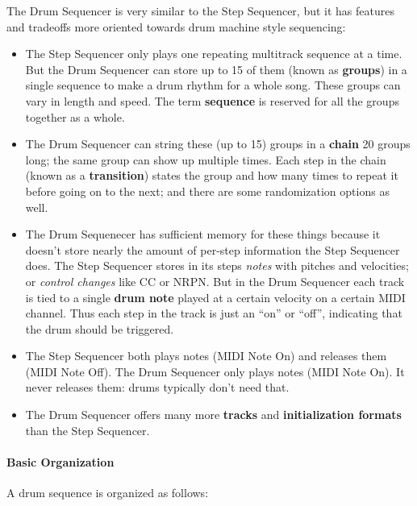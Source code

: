 \documentclass{article}
\begin{document}
The Drum Sequencer is very similar to the Step Sequencer, but it has features and tradeoffs more oriented towards drum machine style sequencing:

\begin{itemize}
\item The Step Sequencer only plays one repeating multitrack sequence at a time.   But the Drum Sequencer can store up to 15 of them (known as {\bf groups}) in a single sequence to make a drum rhythm for a whole song.  These groups can vary in length and speed.  The term {\bf sequence} is reserved for all the groups together as a whole.
\end{itemize}

\begin{itemize}
\item The Drum Sequencer can string these (up to 15) groups in a {\bf chain} 20 groups long; the same group can show up multiple times.  Each step in the chain (known as a {\bf transition}) states the group and how many times to repeat it before going on to the next; and there are some randomization options as well.
\item The Drum Sequenecer has sufficient memory for these things because it doesn't store nearly the amount of per-step information the Step Sequencer does. The Step Sequencer stores in its steps {\it notes} with pitches and velocities; or {\it control changes} like CC or NRPN.  But in the Drum Sequencer each track is tied to a single {\bf drum note} played at a certain velocity on a certain MIDI channel.  Thus each step in the track is just an ``on'' or ``off'', indicating that the drum should be triggered.
\item The Step Sequencer both plays notes (MIDI Note On) and releases them (MIDI Note Off).  The Drum Sequencer only plays notes (MIDI Note On).  It never releases them: drums typically don't need that.
\item The Drum Sequencer offers many more {\bf tracks} and {\bf initialization formats} than the Step Sequencer.
\end{itemize}

\paragraph{Basic Organization} A drum sequence is organized as follows:
\end{document}
